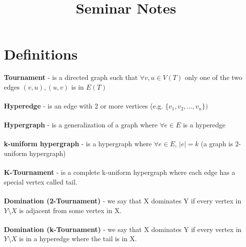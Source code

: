 \documentclass[a4paper,12pt]{article}
\begin{document}
	
\begin{titlepage}
	\title{Seminar Notes}
	\maketitle
\end{titlepage}

\section{Definitions} 

\textbf{Tournament} - is a directed graph such that $\forall v,u\in V(T)$ only one of the two edges $(v,u),(u,v)$ is in $E(T)$ \\
\\
\textbf{Hyperedge} - is an edge with 2 or more vertices (e.g. $\{v_1,v_2,...,v_n\})$ \\
\\
\textbf{Hypergraph} - is a generalization of a graph where $\forall e\in E$ is a hyperedge \\
\\
\textbf{k-uniform hypergraph} - is a hypergraph where $\forall e\in E$, $|e|=k$ (a graph is 2-uniform hypergraph)\\
\\
\textbf{K-Tournament} - is a complete k-uniform hypergraph where each edge has a special vertex called tail.\\
\\
\textbf{Domination (2-Tournament)} - we say that X dominates Y if every vertex in $ Y\setminus X$ is adjacent from some vertex in X.\\
\\
\textbf{Domination (k-Tournament)} - we say that X dominates Y if every vertex in $ Y\setminus X$ is in a hyperedge where the tail is in X.\\
\\
\textbf{}
\end{document}
